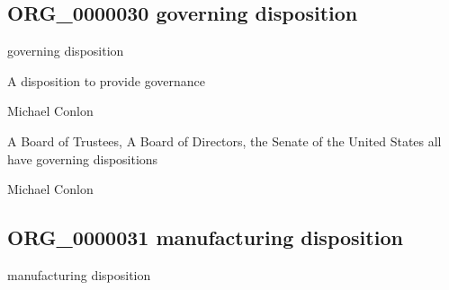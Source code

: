 \documentclass[letterpaper,10pt,english]{sphinxmanual}
\begin{document}
\subsection{ORG\_0000030 \sphinxhyphen{} governing disposition}
\label{\detokenize{doc-ORG_0000030:org-0000030-governing-disposition}}\label{\detokenize{doc-ORG_0000030:index-0}}\label{\detokenize{doc-ORG_0000030::doc}}
\begin{sphinxShadowBox}

\sphinxAtStartPar
governing disposition
\end{sphinxShadowBox}

\begin{sphinxShadowBox}

\sphinxAtStartPar
A disposition to provide governance
\end{sphinxShadowBox}

\begin{sphinxShadowBox}

\sphinxAtStartPar
Michael Conlon 
\end{sphinxShadowBox}

\begin{sphinxShadowBox}

\sphinxAtStartPar
A Board of Trustees, A Board of Directors, the Senate of the United States all have governing dispositions
\end{sphinxShadowBox}

\begin{sphinxShadowBox}

\sphinxAtStartPar
Michael Conlon 
\end{sphinxShadowBox}
\begin{quote}

\ignorespaces \end{quote}


\subsection{ORG\_0000031 \sphinxhyphen{} manufacturing disposition}
\label{\detokenize{doc-ORG_0000031:org-0000031-manufacturing-disposition}}\label{\detokenize{doc-ORG_0000031:index-0}}\label{\detokenize{doc-ORG_0000031::doc}}
\begin{sphinxShadowBox}

\sphinxAtStartPar
manufacturing disposition
\end{sphinxShadowBox}
\end{document}
